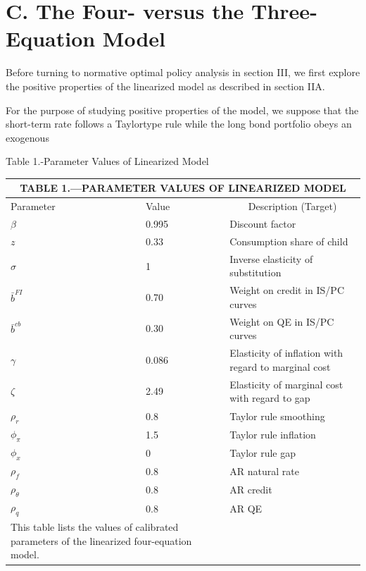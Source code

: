 \documentclass[10pt]{article}
\begin{document}
\section*{C. The Four- versus the Three-Equation Model}
Before turning to normative optimal policy analysis in section III, we first explore the positive properties of the linearized model as described in section IIA.

For the purpose of studying positive properties of the model, we suppose that the short-term rate follows a Taylortype rule while the long bond portfolio obeys an exogenous

Table 1.-Parameter Values of Linearized Model

\begin{center}
\begin{tabular}{lll}
\multicolumn{3}{c}{TABLE 1.—PARAMETER VALUES OF LINEARIZED MODEL} \\
\hline\hline
Parameter & Value & \multicolumn{1}{c}{Description (Target)} \\
\hline
$\beta$ & 0.995 & Discount factor \\
$z$ & 0.33 & Consumption share of child \\
$\sigma$ & 1 & Inverse elasticity of substitution \\
$\bar{b}^{F I}$ & 0.70 & Weight on credit in IS/PC curves \\
$\bar{b}^{c b}$ & 0.30 & Weight on QE in IS/PC curves \\
$\gamma$ & 0.086 & Elasticity of inflation with regard to marginal cost \\
$\zeta$ & 2.49 & Elasticity of marginal cost with regard to gap \\
$\rho_{r}$ & 0.8 & Taylor rule smoothing \\
$\phi_{\pi}$ & 1.5 & Taylor rule inflation \\
$\phi_{x}$ & 0 & Taylor rule gap \\
$\rho_{f}$ & 0.8 & AR natural rate \\
$\rho_{\theta}$ & 0.8 & AR credit \\
$\rho_{q}$ & 0.8 & AR QE \\
\hline
\multicolumn{2}{l|}{This table lists the values of calibrated parameters of the linearized four-equation model.} &  \\
\hline
\end{tabular}
\end{center}
\end{document}

